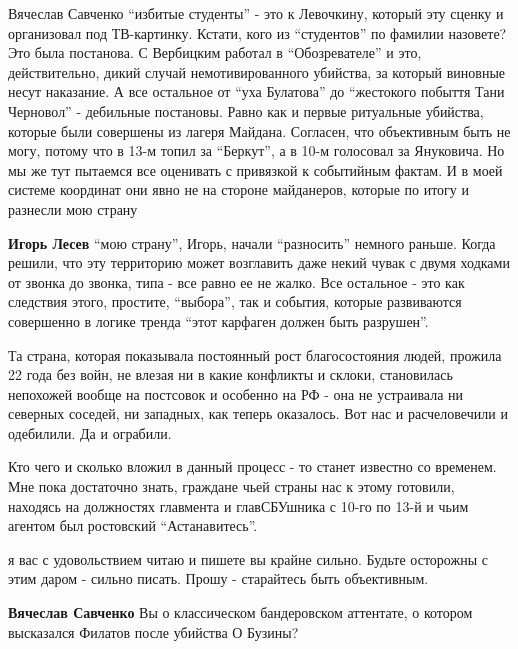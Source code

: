 \begin{itemize}
\begin{itemize}

Вячеслав Савченко \enquote{избитые студенты} - это к Левочкину, который эту сценку и
организовал под ТВ-картинку. Кстати, кого из \enquote{студентов} по фамилии назовете?
Это была постанова. С Вербицким работал в \enquote{Обозревателе} и это, действительно,
дикий случай немотивированного убийства, за который виновные несут наказание. А
все остальное от \enquote{уха Булатова} до \enquote{жестокого побыття Тани Черновол} -
дебильные постановы. Равно как и первые ритуальные убийства, которые были
совершены из лагеря Майдана. Согласен, что объективным быть не могу, потому что
в 13-м топил за \enquote{Беркут}, а в 10-м голосовал за Януковича. Но мы же тут
пытаемся все оценивать с привязкой к событийным фактам. И в моей системе
координат они явно не на стороне майданеров, которые по итогу и разнесли мою
страну


\textbf{Игорь Лесев} \enquote{мою страну}, Игорь, начали \enquote{разносить} немного раньше. Когда
решили, что эту территорию может возглавить даже некий чувак с двумя ходками от
звонка до звонка, типа - все равно ее не жалко. Все остальное - это как
следствия этого, простите, \enquote{выбора}, так и события, которые развиваются
совершенно в логике тренда \enquote{этот карфаген должен быть разрушен}.

Та страна, которая показывала постоянный рост благосостояния людей, прожила 22
года без войн, не влезая ни в какие конфликты и склоки, становилась непохожей
вообще на постсовок и особенно на РФ - она не устраивала ни северных соседей,
ни западных, как теперь оказалось. Вот нас и расчеловечили и одебилили. Да и
ограбили.

Кто чего и сколько вложил в данный процесс - то станет известно со временем.
Мне пока достаточно знать, граждане чьей страны нас к этому готовили, находясь
на должностях главмента и главСБУшника с 10-го по 13-й и чьим агентом был
ростовский \enquote{Астанавитесь}.


я вас с удовольствием читаю и пишете вы крайне сильно. Будьте осторожны с этим
даром - сильно писать. Прошу - старайтесь быть объективным.


\textbf{Вячеслав Савченко} Вы о классическом бандеровском аттентате, о котором высказался
Филатов после убийства О Бузины?



\end{itemize}
\end{itemize}
